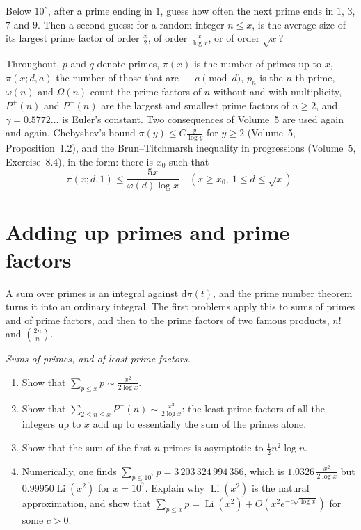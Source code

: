 \begin{think}
Below $10^8$, after a prime ending in $1$, guess how often the next prime ends in $1$, $3$, $7$ and $9$. Then a second guess: for a random integer $n\le x$, is
the average size of its largest prime factor of order $\frac x2$, of order $\frac x{\log x}$, or of order $\sqrt x$?
\end{think}

Throughout, $p$ and $q$ denote primes, $\pi(x)$ is the number of primes up to $x$, $\pi(x;d,a)$ the number of those that are $\equiv a\pmod d$, $p_n$ is the $n$-th
prime, $\omega(n)$ and $\Omega(n)$ count the prime factors of $n$ without and with multiplicity, $P^+(n)$ and $P^-(n)$ are the largest and smallest prime factors of
$n\ge2$, and $\gamma=0.5772\ldots$ is Euler's constant. Two consequences of Volume~5 are used again and again. Chebyshev's bound $\pi(y)\le C\frac y{\log y}$ for $y\ge2$
(Volume~5, Proposition~1.2), and the Brun--Titchmarsh inequality in progressions (Volume~5, Exercise~8.4), in the form: there is $x_0$ such that
\begin{equation}\label{eq:bt13}
\pi(x;d,1)\le\frac{5x}{\varphi(d)\log x}\quad(x\ge x_0,\ 1\le d\le\sqrt x).
\end{equation}

\section{Adding up primes and prime factors}

A sum over primes is an integral against $\mathrm d\pi(t)$, and the prime number theorem turns it into an ordinary integral. The first problems apply this to sums of
primes and of prime factors, and then to the prime factors of two famous products, $n!$ and $\binom{2n}n$.

\begin{exercise}[$\star$]\label{pb:leastpf}
\emph{Sums of primes, and of least prime factors.}
\begin{enumerate}[label=(\alph*)]
\item Show that $\sum_{p\le x}p\sim\frac{x^2}{2\log x}$.
\item Show that $\sum_{2\le n\le x}P^-(n)\sim\frac{x^2}{2\log x}$: the least prime factors of all the integers up to $x$ add up to essentially the sum of the primes alone.
\item Show that the sum of the first $n$ primes is asymptotic to $\frac12n^2\log n$.
\item Numerically, one finds $\sum_{p\le10^7}p=3\,203\,324\,994\,356$, which is $1.0326\,\frac{x^2}{2\log x}$ but $0.99950\operatorname{Li}(x^2)$ for $x=10^7$. Explain why
$\operatorname{Li}(x^2)$ is the natural approximation, and show that $\sum_{p\le x}p=\operatorname{Li}(x^2)+O(x^2e^{-c\sqrt{\log x}})$ for some $c>0$.
\end{enumerate}
\end{exercise}

